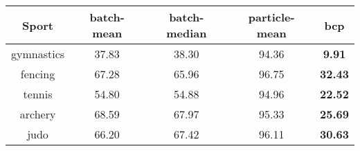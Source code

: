 \begin{tabular}{|c|c|c|c|c|}
\hline
Sport & batch-mean & batch-median & particle-mean & bcp \\
\hline
gymnastics & 37.83 & 38.30 & 94.36 & \textbf{9.91} \\
fencing & 67.28 & 65.96 & 96.75 & \textbf{32.43} \\
tennis & 54.80 & 54.88 & 94.96 & \textbf{22.52} \\
archery & 68.59 & 67.97 & 95.33 & \textbf{25.69} \\
judo & 66.20 & 67.42 & 96.11 & \textbf{30.63} \\
\hline
\end{tabular}
